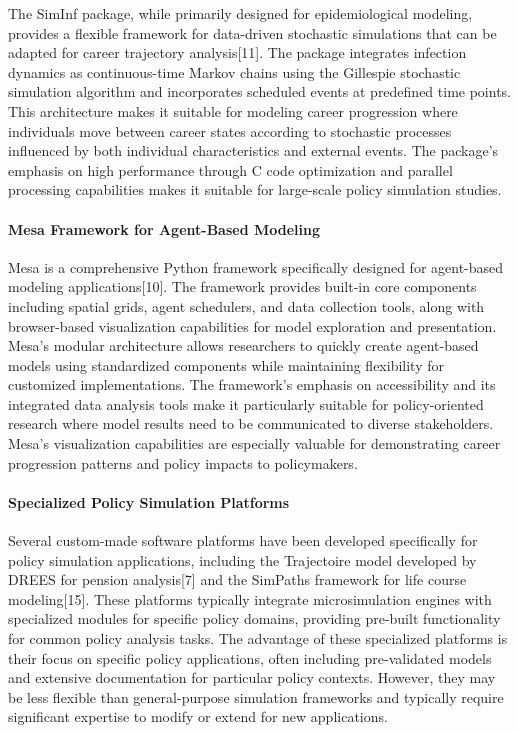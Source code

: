 \documentclass[main.tex]{subfiles}
\begin{document}
The SimInf package, while primarily designed for epidemiological modeling, provides a flexible framework for data-driven stochastic simulations that can be adapted for career trajectory analysis[11]. The package integrates infection dynamics as continuous-time Markov chains using the Gillespie stochastic simulation algorithm and incorporates scheduled events at predefined time points. This architecture makes it suitable for modeling career progression where individuals move between career states according to stochastic processes influenced by both individual characteristics and external events. The package's emphasis on high performance through C code optimization and parallel processing capabilities makes it suitable for large-scale policy simulation studies.

\paragraph{Mesa Framework for Agent-Based Modeling}

Mesa is a comprehensive Python framework specifically designed for agent-based modeling applications[10]. The framework provides built-in core components including spatial grids, agent schedulers, and data collection tools, along with browser-based visualization capabilities for model exploration and presentation. Mesa's modular architecture allows researchers to quickly create agent-based models using standardized components while maintaining flexibility for customized implementations. The framework's emphasis on accessibility and its integrated data analysis tools make it particularly suitable for policy-oriented research where model results need to be communicated to diverse stakeholders. Mesa's visualization capabilities are especially valuable for demonstrating career progression patterns and policy impacts to policymakers.

\paragraph{Specialized Policy Simulation Platforms}

Several custom-made software platforms have been developed specifically for policy simulation applications, including the Trajectoire model developed by DREES for pension analysis[7] and the SimPaths framework for life course modeling[15]. These platforms typically integrate microsimulation engines with specialized modules for specific policy domains, providing pre-built functionality for common policy analysis tasks. The advantage of these specialized platforms is their focus on specific policy applications, often including pre-validated models and extensive documentation for particular policy contexts. However, they may be less flexible than general-purpose simulation frameworks and typically require significant expertise to modify or extend for new applications.
\end{document}
